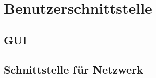\documentclass[pflichtenheft.tex]{subfiles}
\begin{document}
\chapter{Benutzerschnittstelle}
\section{GUI}
\section{Schnittstelle für Netzwerk}
\end{document}
